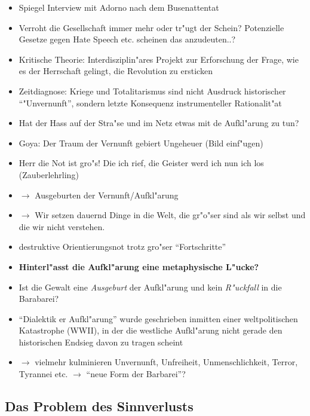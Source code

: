 \documentclass[emulatestandardclasses]{scrartcl}
\begin{document}
\begin{itemize}
  \item Spiegel Interview mit Adorno nach dem Busenattentat
  \item Verroht die Gesellschaft immer mehr oder tr"ugt der Schein? Potenzielle Gesetze gegen Hate Speech etc. scheinen das anzudeuten..?
  \item Kritische Theorie: Interdisziplin"ares Projekt zur Erforschung der Frage, wie es der Herrschaft gelingt, die Revolution zu ersticken
  \item Zeitdiagnose: Kriege und Totalitarismus sind nicht Ausdruck historischer "`"Unvernunft"', sondern letzte Konsequenz instrumenteller Rationalit"at
  \item Hat der Hass auf der Stra"se und im Netz etwas mit de Aufkl"arung zu tun?
  \item Goya: Der Traum der Vernunft gebiert Ungeheuer (Bild einf"ugen)
  \item Herr die Not ist gro"s! Die ich rief, die Geister werd ich nun ich los (Zauberlehrling)
  \item $\rightarrow$ Ausgeburten der Vernunft/Aufkl"arung
  \item $\rightarrow$ Wir setzen dauernd Dinge in die Welt, die gr"o"ser sind als wir selbst und die wir nicht verstehen.
  \item destruktive Orientierungsnot trotz gro"ser "`Fortschritte"'
  \item \textbf{Hinterl"asst die Aufkl"arung eine metaphysische L"ucke?}
  \item Ist die Gewalt eine \emph{Ausgeburt} der Aufkl"arung und kein \emph{R"uckfall} in die Barabarei?
  \item "`Dialektik er Aufkl"arung"' wurde geschrieben inmitten einer weltpolitischen Katastrophe (WWII), in der die westliche Aufkl"arung nicht gerade den historischen Endsieg davon zu tragen scheint
  \item $\rightarrow$ vielmehr kulminieren Unvernunft, Unfreiheit, Unmenschlichkeit, Terror, Tyrannei etc. $\rightarrow$ "`neue Form der Barbarei"'?
\end{itemize}


\subsection{Das Problem des Sinnverlusts}
\end{document}
